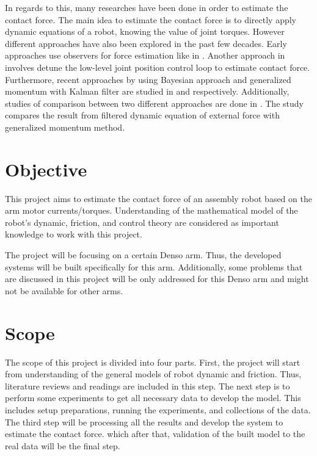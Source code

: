 In regards to this, many researches have been done in order to estimate the contact force. The main idea to estimate the contact force is to directly apply dynamic equations of a robot, knowing the value of joint torques. However different approaches have also been explored in the past few decades. Early approaches use observers for force estimation like in \cite{Ohi91}. Another approach in \cite{Stolt12} involves detune the low-level joint position control loop to estimate contact force. Furthermore, recent approaches by using Bayesian approach and generalized momentum with Kalman filter are studied in \cite{Hao14} and \cite{Hao15} respectively. Additionally, studies of comparison between two different approaches are done in \cite{Beyl11}. The study compares the result from filtered dynamic equation of external force with generalized momentum method.

\section{Objective}


This project aims to estimate the contact force of an assembly robot based on the arm motor currents/torques. Understanding of the mathematical model of the robot’s dynamic, friction, and control theory are considered as important knowledge to work with this project.

The project will be focusing on a certain Denso arm. Thus, the developed systems will be built specifically for this arm. Additionally, some problems that are discussed in this project will be only addressed for this Denso arm and might not be available for other arms.


\section{Scope}


The scope of this project is divided into four parts. First, the project will start from understanding of the general models of robot dynamic and friction. Thus, literature reviews and readings are included in this step. The next step is to perform some experiments to get all necessary data to develop the model. This includes setup preparations, running the experiments, and collections of the data. The third step will be processing all the results and develop the system to estimate the contact force. which after that, validation of the built model to the real data will be the final step.
